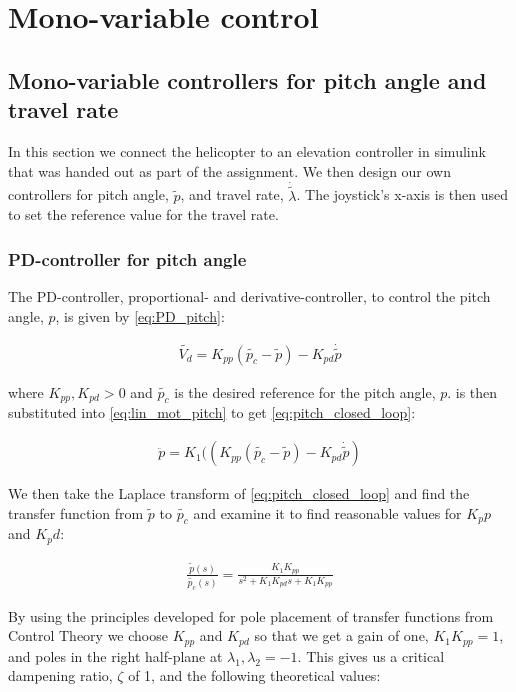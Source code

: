 \section{Mono-variable control}\label{sec:part2}

\subsection{Mono-variable controllers for pitch angle and travel rate}
In this section we connect the helicopter to an elevation controller in simulink that was handed out as part of the assignment. We then design our own controllers for pitch angle, $\tilde{p}$, and travel rate, $\dot{\tilde{\lambda}}$. The joystick's x-axis is then used to set the reference value for the travel rate.

\subsubsection{PD-controller for pitch angle}
The PD-controller, proportional- and derivative-controller, to control the pitch angle, $p$, is given by \cref{eq:PD_pitch}:


\begin{gather}\label{eq:PD_pitch}
    \tilde{V_d} = K_{pp}(\tilde{p_c}-\tilde{p}) - K_{pd}\dot{\tilde{p}}
\end{gather}

where $K_{pp}, K_{pd} > 0$ and $\tilde{p_c}$ is the desired reference for the pitch angle, $p$.  is then substituted into \cref{eq:lin_mot_pitch} to get \cref{eq:pitch_closed_loop}:

\begin{gather}\label{eq:pitch_closed_loop}
    \ddot{p} = K_{1}((K_{pp}(\tilde{p_c}-\tilde{p}) - K_{pd}\dot{\tilde{p}})
\end{gather}

We then take the Laplace transform of \cref{eq:pitch_closed_loop} and find the transfer function from $\tilde{p}$ to $\tilde{p_{c}}$ and examine it to find reasonable values for $K_pp$ and $K_pd$:

\begin{gather}\label{eq:TF_pitch}
    \frac{\tilde{p}(s)}{\tilde{p_{c}}(s)} = \frac{K_{1}K_{pp}}{s^2 + K_{1}K_{pd}s + K_{1}K_{pp}}
\end{gather}

By using the principles developed for pole placement of transfer functions from Control Theory\cite{regtek} we choose $K_{pp}$ and $K_{pd}$ so that we get a gain of one, $K_{1}K_{pp} = 1$, and poles in the right half-plane at $\lambda_{1}, \lambda_{2} = -1$. This gives us a critical dampening ratio, $\zeta$ of 1, and the following theoretical values:


